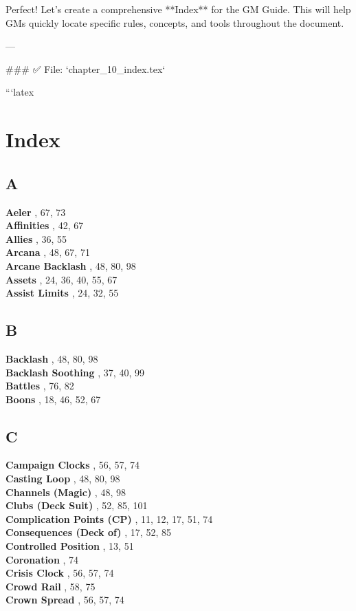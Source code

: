 Perfect! Let's create a comprehensive **Index** for the GM Guide. This will help GMs quickly locate specific rules, concepts, and tools throughout the document.

---

### ✅ File: `chapter_10_index.tex`

```latex
\chapter*{Index}

\section*{A}
\textbf{Aeler} , 67, 73\\
\textbf{Affinities} , 42, 67\\
\textbf{Allies} , 36, 55\\
\textbf{Arcana} , 48, 67, 71\\
\textbf{Arcane Backlash} , 48, 80, 98\\
\textbf{Assets} , 24, 36, 40, 55, 67\\
\textbf{Assist Limits} , 24, 32, 55\\

\section*{B}
\textbf{Backlash} , 48, 80, 98\\
\textbf{Backlash Soothing} , 37, 40, 99\\
\textbf{Battles} , 76, 82\\
\textbf{Boons} , 18, 46, 52, 67\\

\section*{C}
\textbf{Campaign Clocks} , 56, 57, 74\\
\textbf{Casting Loop} , 48, 80, 98\\
\textbf{Channels (Magic)} , 48, 98\\
\textbf{Clubs (Deck Suit)} , 52, 85, 101\\
\textbf{Complication Points (CP)} , 11, 12, 17, 51, 74\\
\textbf{Consequences (Deck of)} , 17, 52, 85\\
\textbf{Controlled Position} , 13, 51\\
\textbf{Coronation} , 74\\
\textbf{Crisis Clock} , 56, 57, 74\\
\textbf{Crowd Rail} , 58, 75\\
\textbf{Crown Spread} , 56, 57, 74\\

